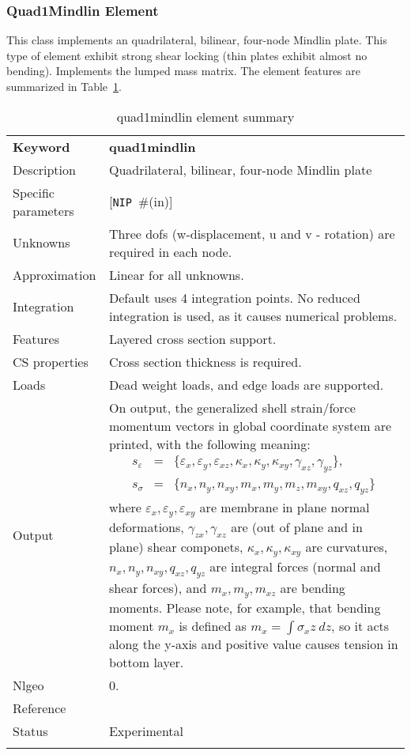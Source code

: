 \documentclass[a4paper]{article}
\newcommand{\param}[1]{\texttt{#1}} %
\newcommand{\optional}[1]{[#1]} %
\newcommand{\field}[2]{\param{#1}~\#{\tiny(#2)}} %
\newcommand{\optField}[2]{\optional{\field{#1}{#2}}}
\newcommand{\templabel}{}%
\newcommand{\tempcaption}{}%
\newcounter{nelpar}
\newenvironment{elementsummary}[5]{%
  \gdef\tempcaption{#4}%
  \gdef\templabel{#5}%
  \setcounter{nelpar}{0}%
  \begin{center} %
    \begin{table}[!htb] %
      \begin{tabular}{|l|p{9cm}|}\hline %
        {\bf Keyword} & \bf{#1}\\ %
        {Description} & {#2}\\ %
        {Specific parameters} & {#3}\\ \hline %
}{
  \\ \hline %
      \end{tabular}%
      \caption{\tempcaption}%
      \label{\templabel}%
    \end{table}%
  \end{center}%
}
\newcommand{\elementParam}[1]{%
  \ifthenelse{\value{nelpar}>0} %
             {&{#1}}%
             {\setcounter{nelpar}{1}Parameters&{#1}}%
             \\%
}
\newcommand{\elementDescription}[2]{{#1} & {#2}\\ }
\begin{document}
\subsubsection{Quad1Mindlin Element} \label{quad1mindlin}
This class implements an quadrilateral, bilinear, four-node Mindlin plate.
This type of element exhibit strong shear locking (thin plates exhibit almost no bending).
Implements the lumped mass matrix. The element features are summarized in Table~\ref{quad1mindlinsummary}.

\begin{elementsummary}{quad1mindlin}{Quadrilateral, bilinear, four-node Mindlin plate}{\optField{NIP}{in}}{quad1mindlin element summary}{quad1mindlinsummary}
\elementDescription{Unknowns}{Three dofs (w-displacement, u and v - rotation) are required in each node.}
\elementDescription{Approximation}{Linear for all unknowns.}
\elementDescription{Integration}{Default uses 4 integration points. No reduced integration is used, as it causes numerical problems.}
\elementDescription{Features}{Layered cross section support.}
\elementDescription{CS properties}{Cross section thickness is required.}
\elementDescription{Loads}{Dead weight loads, and edge loads are supported.}
\elementDescription{Output}{On output, the generalized shell strain/force momentum vectors in global coordinate system are printed, with the following meaning:
\begin{eqnarray*}
s_{\varepsilon}&=&\{\varepsilon_x, \varepsilon_y, \varepsilon_{xz}, \kappa_x, \kappa_y, \kappa_{xy}, \gamma_{xz}, \gamma_{yz}\},\\
s_{\sigma}&=&\{n_x, n_y, n_{xy}, m_x, m_y, m_z, m_{xy}, q_{xz}, q_{yz}\}
\end{eqnarray*}
where $\varepsilon_x, \varepsilon_y, \varepsilon_{xy}$ are membrane in plane normal deformations, $\gamma_{zx}, \gamma_{xz}$ are (out of plane and in plane) shear componets, $\kappa_x, \kappa_y, \kappa_{xy}$ are curvatures, $n_x, n_y, n_{xy}, q_{xz}, q_{yz}$ are integral forces (normal and shear forces), and $m_x, m_y, m_{xz}$ are bending moments. 
Please note, for example, that bending moment $m_x$ is defined as $m_x=\int \sigma_x z\ dz$, so it acts along the y-axis and positive value causes tension in bottom layer.}
\elementDescription{Nlgeo}{0.}
\elementDescription{Reference}{\cite{RobertCook1989}}
\elementDescription{Status}{Experimental}
\end{elementsummary}
\end{document}
